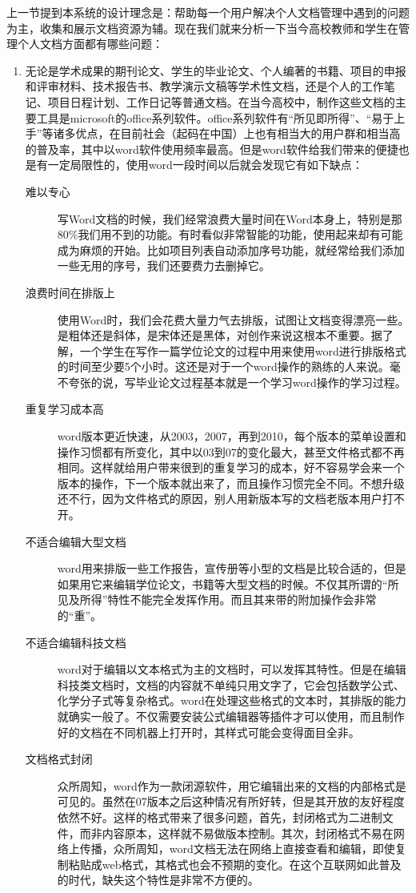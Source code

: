上一节提到本系统的设计理念是：帮助每一个用户解决个人文档管理中遇到的问题为主，收集和展示文档资源为辅。现在我们就来分析一下当今高校教师和学生在管理个人文档方面都有哪些问题：
\begin{enumerate}
\item 无论是学术成果的期刊论文、学生的毕业论文、个人编著的书籍、项目的申报和评审材料、技术报告书、教学演示文稿等学术性文档，还是个人的工作笔记、项目日程计划、工作日记等普通文档。在当今高校中，制作这些文档的主要工具是microsoft的office系列软件。office系列软件有“所见即所得”、“易于上手”等诸多优点，在目前社会（起码在中国）上也有相当大的用户群和相当高的普及率，其中以word软件使用频率最高。但是word软件给我们带来的便捷也是有一定局限性的，使用word一段时间以后就会发现它有如下缺点：
  \begin{description}
  \item[难以专心] 写Word文档的时候，我们经常浪费大量时间在Word本身上，特别是那80\%我们用不到的功能。有时看似非常智能的功能，使用起来却有可能成为麻烦的开始。比如项目列表自动添加序号功能，就经常给我们添加一些无用的序号，我们还要费力去删掉它。
  \item[浪费时间在排版上] 使用Word时，我们会花费大量力气去排版，试图让文档变得漂亮一些。是粗体还是斜体，是宋体还是黑体，对创作来说这根本不重要。据了解，一个学生在写作一篇学位论文的过程中用来使用word进行排版格式的时间至少要5个小时。这还是对于一个word操作的熟练的人来说。毫不夸张的说，写毕业论文过程基本就是一个学习word操作的学习过程。
  \item[重复学习成本高] word版本更近快速，从2003，2007，再到2010，每个版本的菜单设置和操作习惯都有所变化，其中以03到07的变化最大，甚至文件格式都不再相同。这样就给用户带来很到的重复学习的成本，好不容易学会来一个版本的操作，下一个版本就出来了，而且操作习惯完全不同。不想升级还不行，因为文件格式的原因，别人用新版本写的文档老版本用户打不开。
  \item[不适合编辑大型文档] word用来排版一些工作报告，宣传册等小型的文档是比较合适的，但是如果用它来编辑学位论文，书籍等大型文档的时候。不仅其所谓的“所见及所得”特性不能完全发挥作用。而且其来带的附加操作会非常的“重”。
  \item[不适合编辑科技文档] word对于编辑以文本格式为主的文档时，可以发挥其特性。但是在编辑科技类文档时，文档的内容就不单纯只用文字了，它会包括数学公式、化学分子式等复杂格式。word在处理这些格式的文本时，其排版的能力就确实一般了。不仅需要安装公式编辑器等插件才可以使用，而且制作好的文档在不同机器上打开时，其样式可能会变得面目全非。
  \item[文档格式封闭] 众所周知，word作为一款闭源软件，用它编辑出来的文档的内部格式是可见的。虽然在07版本之后这种情况有所好转，但是其开放的友好程度依然不好。这样的格式带来了很多问题，首先，封闭格式为二进制文件，而非内容原本，这样就不易做版本控制。其次，封闭格式不易在网络上传播，众所周知，word文档无法在网络上直接查看和编辑，即使复制粘贴成web格式，其格式也会不预期的变化。在这个互联网如此普及的时代，缺失这个特性是非常不方便的。

\end{description}
\end{enumerate}
